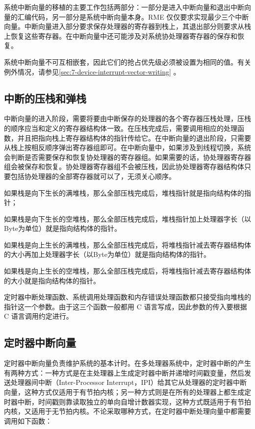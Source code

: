 系统中断向量的移植的主要工作包括两部分：一部分是进入中断向量和退出中断向量的汇编代码，另一部分是系统中断向量本身。RME 仅仅要求实现最少三个中断向量。中断向量进入部分要求保存处理器的寄存器到栈上，其退出部分则要求从栈上恢复这些寄存器。在中断向量中还可能涉及对系统协处理器寄存器的保存和恢复。

系统中断向量不可互相嵌套，因此它们的抢占优先级必须被设置为相同的值。有关例外情况，请参见\ref{sec:7-device-interrupt-vector-writing}
。

\subsection{中断的压栈和弹栈}\label{subsec:7-interrupt-push-and-pop}

中断向量的进入阶段，需要将要由中断保存的处理器的各个寄存器压栈处理，压栈的顺序应当和定义的寄存器结构体一致。在压栈完成后，需要调用相应的处理函数，并且把指向栈上寄存器结构体的指针传给它。在中断向量的退出阶段，只需要从栈上按相反顺序弹出寄存器组即可。在中断向量中，如果涉及到线程切换，系统会判断是否需要保存和恢复协处理器的寄存器组。如果需要的话，协处理器寄存器组会被保存和恢复。协处理器寄存器组不会被压栈，因此协处理器寄存器结构体只要包括协处理器的全部寄存器就可以了，无须关心顺序。

如果栈是向下生长的满堆栈，那么全部压栈完成后，堆栈指针就是指向结构体的指针；

如果栈是向下生长的空堆栈，那么全部压栈完成后，堆栈指针加上处理器字长（以Byte为单位）就是指向结构体的指针。

如果栈是向上生长的满堆栈，那么全部压栈完成后，将堆栈指针减去寄存器结构体的大小再加上处理器字长（以Byte为单位）就是指向结构体的指针。

如果栈是向上生长的空堆栈，那么全部压栈完成后，将堆栈指针减去寄存器结构体的大小就是指向结构体的指针。

定时器中断处理函数、系统调用处理函数和内存错误处理函数都只接受指向堆栈的指针这一个参数。由于这三个函数一般都用 C 语言写成，因此参数的传入要根据 C 语言调用约定进行。

\subsection{定时器中断向量}\label{subsec:7-timer-interrupt-vector}
\nopagebreak[4]

定时器中断向量负责维护系统的基本计时。在多处理器系统中，定时器中断的产生有两种方式：一种方式是在主处理器上生成定时器中断并递增时间戳变量，然后发送处理器间中断（Inter-Processor
Interrupt，IPI）给其它从处理器的定时器中断向量，这种方式仅适用于有节拍内核；另一种方式则是在所有的处理器上都生成定时器中断，时间戳则靠读取独立的单向自增计数器实现，这种方式既适用于有节拍内核，又适用于无节拍内核。不论采取哪种方式，在定时器中断处理向量中都需要调用如下函数：

